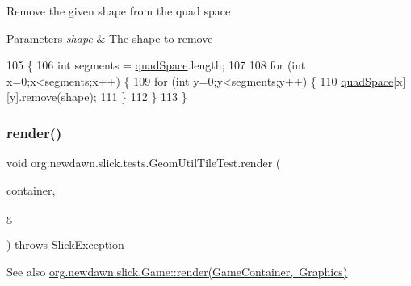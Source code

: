 Remove the given shape from the quad space


\begin{DoxyParams}{Parameters}
{\em shape} & The shape to remove \\
\hline
\end{DoxyParams}

\begin{DoxyCode}
105                                                   \{
106         \textcolor{keywordtype}{int} segments = \mbox{\hyperlink{classorg_1_1newdawn_1_1slick_1_1tests_1_1_geom_util_tile_test_a669ad26af6e1635deb8855d2df3788bb}{quadSpace}}.length;
107         
108         \textcolor{keywordflow}{for} (\textcolor{keywordtype}{int} x=0;x<segments;x++) \{
109             \textcolor{keywordflow}{for} (\textcolor{keywordtype}{int} y=0;y<segments;y++) \{
110                 \mbox{\hyperlink{classorg_1_1newdawn_1_1slick_1_1tests_1_1_geom_util_tile_test_a669ad26af6e1635deb8855d2df3788bb}{quadSpace}}[x][y].remove(shape);
111             \}
112         \}
113     \}
\end{DoxyCode}
\mbox{\label{classorg_1_1newdawn_1_1slick_1_1tests_1_1_geom_util_tile_test_a83cc5204d09adcfcc60278c6ebab33e7}} 
\subsubsection{\texorpdfstring{render()}{render()}}
{\footnotesize\ttfamily void org.\+newdawn.\+slick.\+tests.\+Geom\+Util\+Tile\+Test.\+render (\begin{DoxyParamCaption}\item[{\mbox{\hyperlink{classorg_1_1newdawn_1_1slick_1_1_game_container}{Game\+Container}}}]{container,  }\item[{\mbox{\hyperlink{classorg_1_1newdawn_1_1slick_1_1_graphics}{Graphics}}}]{g }\end{DoxyParamCaption}) throws \mbox{\hyperlink{classorg_1_1newdawn_1_1slick_1_1_slick_exception}{Slick\+Exception}}\hspace{0.3cm}{\ttfamily [inline]}}

\begin{DoxySeeAlso}{See also}
\mbox{\hyperlink{interfaceorg_1_1newdawn_1_1slick_1_1_game_af1a4670d43eb3ba04dfcf55ab1975b64}{org.\+newdawn.\+slick.\+Game\+::render(\+Game\+Container, Graphics)}} 
\end{DoxySeeAlso}


